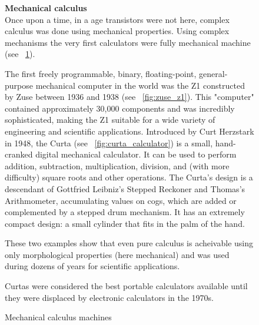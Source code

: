 \begin{figure}[]
    \centering
    \begin{boxedminipage}{0.95\textwidth}
        \textbf{Mechanical calculus}\\
        Once upon a time, in a age transistors were not here, complex calculus was done using mechanical properties.
        Using complex mechanisms the very first calculators were fully mechanical machine (see \figurename~\ref{fig:mechanical_computer}).

        The first freely programmable, binary, floating-point, general-purpose mechanical computer in the world was the Z1 constructed by Zuse between 1936 and 1938 (see \figurename~\ref{fig:zuse_z1}).
        This "computer" contained approximately 30,000 components and was incredibly sophisticated, making the Z1 suitable for a wide variety of engineering and scientific applications.
        Introduced by Curt Herzstark in 1948, the Curta (see \figurename~\ref{fig:curta_calculator}) is a small, hand-cranked digital mechanical calculator.
        It can be used to perform addition, subtraction, multiplication, division, and (with more difficulty) square roots and other operations.
        The Curta's design is a descendant of Gottfried Leibniz's Stepped Reckoner and Thomas's Arithmometer, accumulating values on cogs, which are added or complemented by a stepped drum mechanism.
        It has an extremely compact design: a small cylinder that fits in the palm of the hand.

        These two examples show that even pure calculus is acheivable using only morphological properties (here mechanical) and was used during dozens of years for scientific applications.


        Curtas were considered the best portable calculators available until they were displaced by electronic calculators in the 1970s.

        \begin{center}

            \hfil
            \caption{Mechanical calculus machines}
            \label{fig:mechanical_computer}

        \end{center}

    \end{boxedminipage}
\end{figure}

